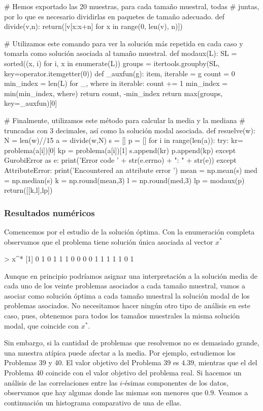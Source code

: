 \documentclass[twoside,a4paper,openright,12pt]{book}
\begin{document}
\begin{pythone}
# Hemos exportado las 20 muestras, para cada tamaño muestral, todas 
# juntas, por lo que es necesario dividirlas en paquetes de tamaño adecuado.
def divide(v,n):
    return([v[x:x+n] for x in range(0, len(v), n)])
    
# Utilizamos este comando para ver la solución más repetida en cada caso y tomarla como solución asociada al tamaño muestral.
def modaux(L):
  SL = sorted((x, i) for i, x in enumerate(L))
  groups = itertools.groupby(SL, key=operator.itemgetter(0))
  def _auxfun(g):
    item, iterable = g
    count = 0
    min_index = len(L)
    for _, where in iterable:
      count += 1
      min_index = min(min_index, where)
    return count, -min_index
  return max(groups, key=_auxfun)[0]
  
# Finalmente, utilizamos este método para calcular la media y la mediana
# truncadas con 3 decimales, así como la solución modal asociada.
def resuelve(w):
    N = len(w)//15
    a = divide(w,N)
    s = []
    p = []
    for i in range(len(a)):
        try:
            kr= problema(a[i])[0]
            kp = problema(a[i])[1]
            s.append(kr)
            p.append(kp)
        except GurobiError as e:
            print('Error code ' + str(e.errno) + ": " + str(e))
        except AttributeError:
            print('Encountered an attribute error ')
    mean = np.mean(s)
    med = np.median(s)
    k = np.round(mean,3)
    l = np.round(med,3)
    lp = modaux(p)
    return([[k,l],lp])
\end{pythone}
\newpage 
\subsubsection*{Resultados numéricos}
Comencemos por el estudio de la solución óptima. Con la enumeración completa observamos que el problema tiene solución única asociada al vector $x^*$
\begin{erre}
> x^*
 [1] 0 1 0 1 1 1 0 0 0 0 1 1 1 1 1 0 1
\end{erre} 
Aunque en principio podríamos asignar una interpretación a la solución media de cada uno de los veinte problemas asociados a cada tamaño muestral, vamos a asociar como solución óptima a cada tamaño muestral la solución modal de los problemas asociados. No necesitamos hacer ningún otro tipo de análisis en este caso, pues, obtenemos para todos los tamaños muestrales la misma solución modal, que coincide con $x^*$.

Sin embargo, si la cantidad de problemas que resolvemos no es demasiado grande, una muestra atípica puede afectar a la media. Por ejemplo, estudiemos los Problemas 39 y 40. El valor objetivo del Problema 39 es $4.39$, mientras que el del Problema 40 coincide con el valor objetivo del problema real. Si hacemos un análisis de las correlaciones entre las $i$-ésimas componentes de los datos, observamos que hay algunas donde las mismas son menores que $0.9$. Veamos a continuación un histograma comparativo de una de ellas. 
\end{document}
